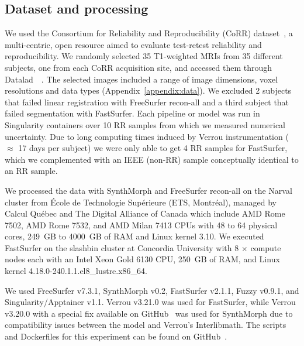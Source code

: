 \subsection{Dataset and processing}
We used the Consortium for Reliability and Reproducibility (CoRR) dataset~\cite{zuo2014open}, a multi-centric, open resource aimed to evaluate test-retest reliability and reproducibility. We randomly selected 35 T1-weighted MRIs from 35 different subjects, one from each CoRR acquisition site, and accessed them through Datalad~\cite{halchenko2021datalad}~\cite{corr-url-datalad}. The selected images included a range of image dimensions, voxel resolutions and data types (Appendix~\ref{appendix:data}). 
We excluded 2 subjects that failed linear registration with FreeSurfer recon-all and a third subject that failed segmentation with FastSurfer. 
Each pipeline or model was run in Singularity containers over 10 RR samples from which we measured numerical uncertainty. Due to long computing times induced by Verrou instrumentation ($\approx$ 17 days per subject) we were only able to get 4 RR 
samples for FastSurfer, which we complemented with an IEEE (non-RR) sample conceptually identical to an RR sample. 

We processed the data with SynthMorph and FreeSurfer recon-all on the Narval cluster from \'Ecole de Technologie Sup\'erieure (ETS, Montr\'eal), managed by Calcul Qu\'ebec and The Digital Alliance of Canada which include AMD Rome 7502, AMD Rome 7532, and AMD Milan 7413 CPUs with 48 to 64 physical cores, 249~GB to 4000~GB of RAM and Linux kernel 3.10.
We executed FastSurfer on the slashbin cluster at Concordia University
with 8 $\times$ compute nodes each with an Intel Xeon Gold 6130 CPU, 250~GB of RAM, and Linux kernel 4.18.0-240.1.1.el8\_lustre.x86\_64.

We used FreeSurfer v7.3.1, SynthMorph v0.2, FastSurfer v2.1.1, Fuzzy v0.9.1, and Singularity/Apptainer v1.1. Verrou v3.21.0 was used for FastSurfer, while Verrou v3.20.0 with a special fix available on GitHub~\cite{verrou-fix} was used for SynthMorph due to compatibility issues between the model and Verrou's Interlibmath.
The scripts and Dockerfiles for this experiment can be found on GitHub~\cite{scripts}.

